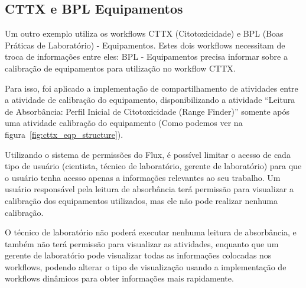 
\subsection{CTTX e BPL Equipamentos} \label{sec:cttx_bpl}

Um outro exemplo utiliza os workflows CTTX (Citotoxicidade) e BPL (Boas Práticas de Laboratório) - Equipamentos. Estes dois workflows necessitam de troca de informações entre eles: BPL - Equipamentos precisa informar sobre a calibração de equipamentos para utilização no workflow CTTX.

Para isso, foi aplicado a implementação de compartilhamento de atividades entre a atividade de calibração do equipamento, disponibilizando a atividade ``Leitura de Absorbância: Perfil Inicial de Citotoxicidade (Range Finder)'' somente após uma atividade calibração do equipamento (Como podemos ver na figura~\ref{fig:cttx_eqp_structure}).

Utilizando o sistema de permissões do Flux, é possível limitar o acesso de cada tipo de usuário (cientista, técnico de laboratório, gerente de laboratório) para que o usuário tenha acesso apenas a informações relevantes ao seu trabalho. Um usuário responsável pela leitura de absorbância terá permissão para visualizar a calibração dos equipamentos utilizados, mas ele não pode realizar nenhuma calibração.

O técnico de laboratório não poderá executar nenhuma leitura de absorbância, e também não terá permissão para visualizar as atividades, enquanto que um gerente de laboratório pode visualizar todas as informações colocadas nos workflows, podendo alterar o tipo de visualização usando a implementação de workflows dinâmicos para obter informações mais rapidamente.

